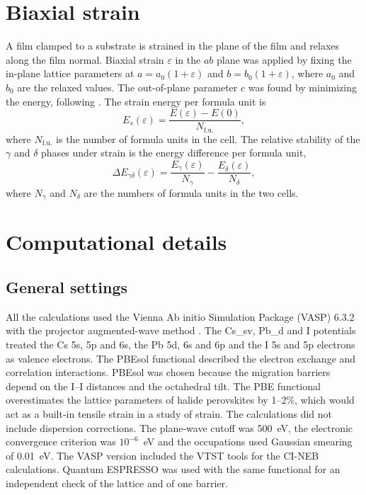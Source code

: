 \section{Biaxial strain}
\label{sec:strain-theory}

A film clamped to a substrate is strained in the plane of the film and relaxes along the film normal. Biaxial strain $\varepsilon$ in the $ab$ plane was applied by fixing the in-plane lattice parameters at $a = a_0(1+\varepsilon)$ and $b = b_0(1+\varepsilon)$, where $a_0$ and $b_0$ are the relaxed values. The out-of-plane parameter $c$ was found by minimizing the energy, following \citet{Xu2019}. The strain energy per formula unit is
\begin{equation*}
  E_s(\varepsilon) = \frac{E(\varepsilon) - E(0)}{N_\mathrm{f.u.}} ,
\end{equation*}
where $N_\mathrm{f.u.}$ is the number of formula units in the cell. The relative stability of the $\gamma$ and $\delta$ phases under strain is the energy difference per formula unit,
\begin{equation}
  \Delta E_{\gamma\delta}(\varepsilon) = \frac{E_\gamma(\varepsilon)}{N_\gamma} - \frac{E_\delta(\varepsilon)}{N_\delta} ,
  \label{eq:gammadelta}
\end{equation}
where $N_\gamma$ and $N_\delta$ are the numbers of formula units in the two cells.

\section{Computational details}
\label{sec:details}

\subsection{General settings}

All the calculations used the Vienna Ab initio Simulation Package (VASP) 6.3.2 \citep{Kresse1996} with the projector augmented-wave method \citep{Blochl1994,Kresse1999}. The Cs\_sv, Pb\_d and I potentials treated the Cs 5s, 5p and 6s, the Pb 5d, 6s and 6p and the I 5s and 5p electrons as valence electrons. The PBEsol functional \citep{Perdew2008} described the electron exchange and correlation interactions. PBEsol was chosen because the migration barriers depend on the I--I distances and the octahedral tilt. The PBE functional overestimates the lattice parameters of halide perovskites by 1--2\%, which would act as a built-in tensile strain in a study of strain. The calculations did not include dispersion corrections. The plane-wave cutoff was 500~eV, the electronic convergence criterion was $10^{-6}$~eV and the occupations used Gaussian smearing of 0.01~eV. The VASP version included the VTST tools for the CI-NEB calculations. Quantum ESPRESSO \citep{Giannozzi2009} was used with the same functional for an independent check of the lattice and of one barrier.

